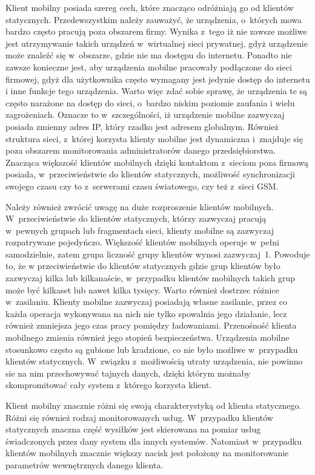 Klient mobilny posiada szereg cech, które znacząco odróżniają go od
klientów statycznych. Przedewszystkim należy zauważyć, że urządzenia,
o~których mowa bardzo często pracują poza obszarem firmy. Wynika
z~tego iż nie zawsze możliwe jest utrzymywanie takich urządzeń
w~wirtualnej sieci prywatnej, gdyż urządzenie może znaleźć się
w~obszarze, gdzie nie ma dostępu do internetu. Ponadto nie zawsze
konieczne jest, aby urządzenia mobilne pracowały podłączone do sieci
firmowej, gdyż dla użytkownika często wymagany jest jedynie dostęp do
internetu i inne funkcje tego urządzenia. Warto więc zdać sobie
sprawę, że urządzenia te są często narażone na dostęp do sieci,
o~bardzo niskim poziomie zaufania i wielu zagrożeniach. Oznacze to
w~szczególności, iż urządzenie mobilne zazwyczaj posiada zmienny adres
IP, który rzadko jest adresem globalnym. Również struktura sieci,
z~której korzysta klienty mobilne jest dynamiczna i~znajduje się poza
obszarem monitorowania administratorów danego
przedsiębiorstwa. Znacząca większość klientów mobilnych dzięki
kontaktom z~sieciom poza firmową posiada, w~przeciwieństwie do
klientów statycznych, możliwość synchronizacji swojego czasu czy to
z~serwerami czasu światowego, czy też z~sieci GSM.

Należy również zwrócić uwagę na duże rozproszenie klientów
mobilnych. W~przeciwieństwie do klientów statycznych, którzy zazwyczaj
pracują w~pewnych grupach lub fragmentach sieci, klienty mobilne są
zazwyczaj rozpatrywane pojedyńczo. Większość klientów mobilnych
operuje w~pełni samodzielnie, zatem grupa liczność grupy klientów
wynosi zazwyczaj~1. Powoduje to, że w przeciwieństwie do klientów
statycznych gdzie grup klientów było zazwyczaj kilka lub kilkanaście,
w~przypadku klientów mobilnych takich grup może być kilkaset lub nawet
kilka tysięcy. Warto również dostrzec różnice w~zasilaniu. Klienty
mobilne zazwyczaj posiadają własne zasilanie, przez co każda operacja
wykonywana na nich nie tylko spowalnia jego działanie, lecz również
zmniejsza jego czas pracy pomiędzy ładowaniami. Przenośność klienta
mobilnego zmienia również jego stopień bezpieczeństwa. Urządzenia
mobilne stosunkowo często są gubione lub kradzione, co nie było
możliwe w~przypadku klientów statycznych. W~związku z~możliwością
utraty urządzenia, nie powinno sie na nim przechowywać tajnych danych,
dzięki którym możnaby skompromitować cały system z~którego korzysta
klient.

Klient mobilny znacznie różni się swoją charakterystyką od klienta
statycznego. Różni się również rodzaj monitorowanych
usług. W~przypadku klientów statycznych znaczna część wysiłków jest
skierowana na pomiar usług świadczonych przez dany system dla innych
systemów. Natomiast w~przypadku klientów mobilnych znacznie większy
nacisk jest położony na monitorowanie parametrów wewnętrznych danego
klienta.

